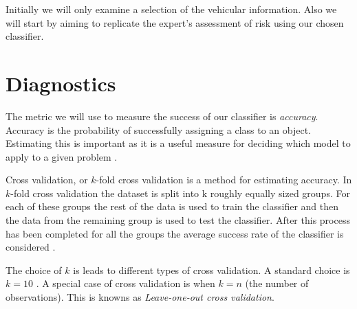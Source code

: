 Initially we will only examine a selection of the vehicular information. Also we will start by aiming to replicate the expert's assessment of risk using our chosen classifier.

\section{Diagnostics}

The metric we will use to measure the success of our classifier is \textit{accuracy}. Accuracy is the probability of successfully assigning a class to an object. Estimating this is important as it is a useful measure for deciding which model to apply to a given problem \cite{Kohavi95}.

Cross validation, or $k$-fold cross validation is a method for estimating accuracy. In $k$-fold cross validation the dataset is split into k roughly equally sized groups. For each of these groups the rest of the data is used to train the classifier and then the  data from the remaining group is used to test the classifier. After this process has been completed for all the groups the average success rate of the classifier is considered \cite{Priddy05}.

The choice of $k$ is leads to different types of cross validation. A standard choice is $k=10$ \cite{Priddy05}. A special case of cross validation is when $k=n$ (the number of observations). This is knowns as \textit{Leave-one-out cross validation}.